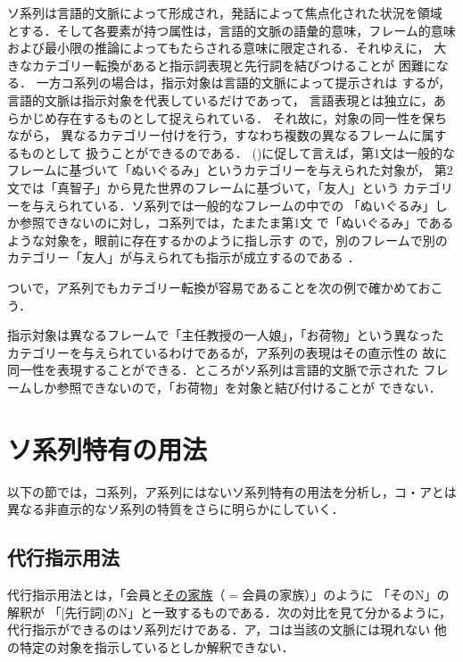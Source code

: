 ソ系列は言語的文脈によって形成され，発話によって焦点化された状況を領域
とする．そして各要素が持つ属性は，言語的文脈の語彙的意味，フレーム的意味
および最小限の推論によってもたらされる意味に限定される．それゆえに，
大きなカテゴリー転換があると指示詞表現と先行詞を結びつけることが
困難になる．
一方コ系列の場合は，指示対象は言語的文脈によって提示されは
するが，言語的文脈は指示対象を代表しているだけであって，
言語表現とは独立に，あらかじめ存在するものとして捉えられている．
それ故に，対象の同一性を保ちながら，
異なるカテゴリー付けを行う，すなわち複数の異なるフレームに属するものとして
扱うことができるのである． ()に促して言えば，第1文は一般的な
フレームに基づいて「ぬいぐるみ」というカテゴリーを与えられた対象が，
第2文では「真智子」から見た世界のフレームに基づいて，「友人」という
カテゴリーを与えられている．ソ系列では一般的なフレームの中での
「ぬいぐるみ」しか参照できないのに対し，コ系列では，たまたま第1文
で「ぬいぐるみ」であるような対象を，眼前に存在するかのように指し示す
ので，別のフレームで別のカテゴリー「友人」が与えられても指示が成立するのである
．

ついで，ア系列でもカテゴリー転換が容易であることを次の例で確かめておこう．


指示対象は異なるフレームで「主任教授の一人娘」，「お荷物」という異なった
カテゴリーを与えられているわけであるが，ア系列の表現はその直示性の
故に同一性を表現することができる．ところがソ系列は言語的文脈で示された
フレームしか参照できないので，「お荷物」を対象と結び付けることが
できない．

\section{ソ系列特有の用法}
以下の節では，コ系列，ア系列にはないソ系列特有の用法を分析し，コ・アとは
異なる非直示的なソ系列の特質をさらに明らかにしていく．

\subsection{代行指示用法}
代行指示用法とは，「会員と\ul{その家族}（$=$会員の家族）」のように
「そのN」の解釈が
「[先行詞]のN」と一致するものである．次の対比を見て分かるように，
代行指示ができるのはソ系列だけである．ア，コは当該の文脈には現れない
他の特定の対象を指示しているとしか解釈できない．

